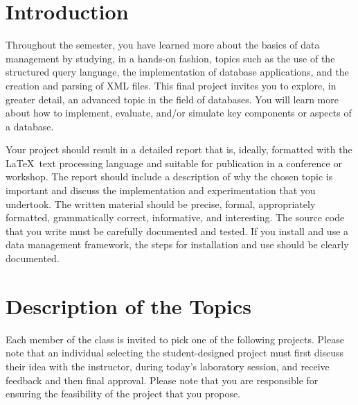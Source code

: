 


\usepackage[compact]{titlesec}



\section*{Introduction}

Throughout the semester, you have learned more about the basics of data management by studying, in a hands-on fashion,
topics such as the use of the structured query language, the implementation of database applications, and the creation
and parsing of XML files.  This final project invites you to explore, in greater detail, an advanced topic in the field
of databases. You will learn more about how to implement, evaluate, and/or simulate key components or aspects of a
database. 

Your project should result in a detailed report that is, ideally, formatted with the \LaTeX\ text processing language
and suitable for publication in a conference or workshop.  The report should include a description of why the chosen
topic is important and discuss the implementation and experimentation that you undertook.  The written material should
be precise, formal, appropriately formatted, grammatically correct, informative, and interesting.  The source code that
you write must be carefully documented and tested.  If you install and use a data management framework, the steps for
installation and use should be clearly documented. 

\section*{Description of the Topics}

Each member of the class is invited to pick one of the following projects.  Please note that an individual selecting the
student-designed project must first discuss their idea with the instructor, during today's laboratory session, and
receive feedback and then final approval.  Please note that you are responsible for ensuring the feasibility of the
project that you propose.

